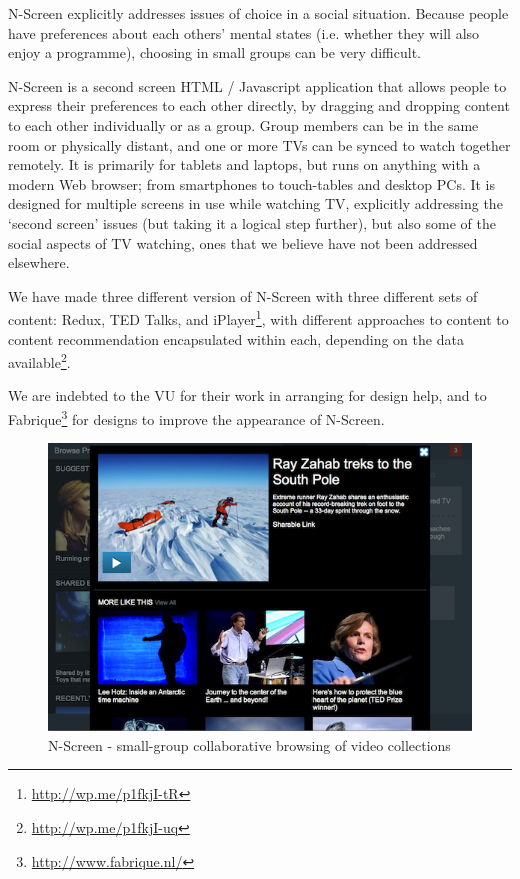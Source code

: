\documentclass{notube}
\begin{document}
N-Screen explicitly addresses issues of choice in a social situation. Because people have preferences about each others' mental states (i.e. whether they will also enjoy a programme), choosing in small groups can be very difficult. 

N-Screen is a second screen HTML / Javascript application that allows people to express their preferences to each other directly, by dragging and dropping content to each other individually or as a group. Group members can be in the same room or physically distant, and one or more TVs can be synced to watch together remotely. It is primarily for tablets and laptops, but runs on anything with a modern Web browser; from smartphones to touch-tables and desktop PCs. It is designed for multiple screens in use while watching TV, explicitly addressing the `second screen' issues (but taking it a logical step further), but also some of the social aspects of TV watching, ones that we believe have not been addressed elsewhere.

We have made three different version of N-Screen with three different sets of content: Redux, TED Talks, and iPlayer\footnote{\url{http://wp.me/p1fkjI-tR}}, with different approaches to content to content recommendation encapsulated within each, depending on the data available\footnote{\url{http://wp.me/p1fkjI-uq}}.

We are indebted to the VU for their work in arranging for design help, and to Fabrique\footnote{\url{http://www.fabrique.nl/}} for designs to improve the appearance of N-Screen.

\begin{figure}[htbp]
\begin{center}
\includegraphics[width=6in]{images/nscreen.png}
\caption{N-Screen - small-group collaborative browsing of video collections} \label{fig:nscreen}
\end{center}
\end{figure} 
\end{document}
